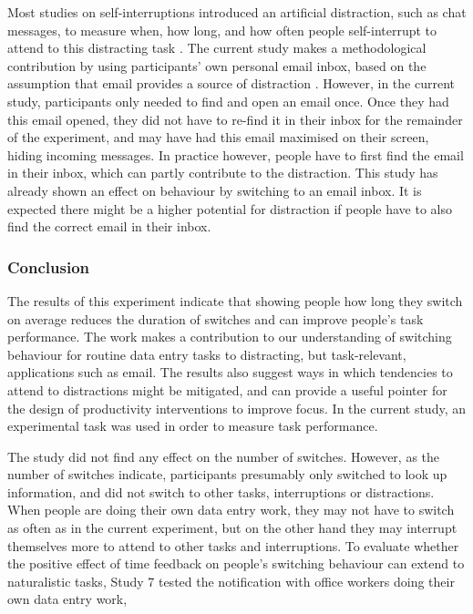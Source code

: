 Most studies on self-interruptions introduced an artificial distraction, such as chat messages, to measure when, how long, and how often people self-interrupt to attend to this distracting task \citep{Katidioti2013, Salvucci2010}. The current study makes a methodological contribution by using participants' own personal email inbox, based on the assumption that email provides a source of distraction \citep{Hanrahan2015, Mark2016}. However, in the current study, participants only needed to find and open an email once. Once they had this email opened, they did not have to re-find it in their inbox for the remainder of the experiment, and may have had this email maximised on their screen, hiding incoming messages. In practice however, people have to first find the email in their inbox, which can partly contribute to the distraction. This study has already shown an effect on behaviour by switching to an email inbox. It is expected there might be a higher potential for distraction if people have to also find the correct email in their inbox.

\subsubsection{Conclusion}
The results of this experiment indicate that showing people how long they switch on average reduces the duration of switches and can improve people's task performance. The work makes a contribution to our understanding of switching behaviour for routine data entry tasks to distracting, but task-relevant, applications such as email. The results also suggest ways in which tendencies to attend to distractions might be mitigated, and can provide a useful pointer for the design of productivity interventions to improve focus. In the current study, an experimental task was used in order to measure task performance. 

The study did not find any effect on the number of switches. However, as the number of switches indicate, participants presumably only switched to look up information, and did not switch to other tasks, interruptions or distractions. When people are doing their own data entry work, they may not have to switch as often as in the current experiment, but on the other hand they may interrupt themselves more to attend to other tasks and interruptions. To evaluate whether the positive effect of time feedback on people's switching behaviour can extend to naturalistic tasks, Study 7 tested the notification with office workers doing their own data entry work,

